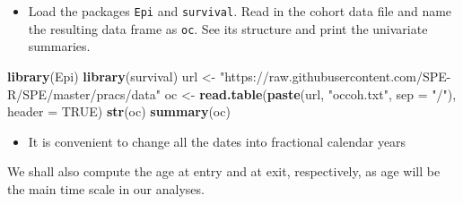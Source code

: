 \documentclass[
]{book}
\newenvironment{Shaded}{\begin{snugshade}}{\end{snugshade}}
\newcommand{\AttributeTok}[1]{\textcolor[rgb]{0.13,0.29,0.53}{#1}}
\newcommand{\ConstantTok}[1]{\textcolor[rgb]{0.56,0.35,0.01}{#1}}
\newcommand{\FunctionTok}[1]{\textcolor[rgb]{0.13,0.29,0.53}{\textbf{#1}}}
\newcommand{\NormalTok}[1]{#1}
\newcommand{\OtherTok}[1]{\textcolor[rgb]{0.56,0.35,0.01}{#1}}
\newcommand{\SpecialCharTok}[1]{\textcolor[rgb]{0.81,0.36,0.00}{\textbf{#1}}}
\newcommand{\StringTok}[1]{\textcolor[rgb]{0.31,0.60,0.02}{#1}}
\providecommand{\tightlist}{%
  \setlength{\itemsep}{0pt}\setlength{\parskip}{0pt}}
\begin{document}
\begin{itemize}
\tightlist
\item
  Load the packages \texttt{Epi} and \texttt{survival}.
  Read in the cohort data file and name
  the resulting data frame as \texttt{oc}.
  See its structure and print the univariate summaries.
\end{itemize}

\begin{Shaded}
\begin{Highlighting}[]
\FunctionTok{library}\NormalTok{(Epi)}
\FunctionTok{library}\NormalTok{(survival)}
\NormalTok{url }\OtherTok{\textless{}{-}} \StringTok{"https://raw.githubusercontent.com/SPE{-}R/SPE/master/pracs/data"}
\NormalTok{oc }\OtherTok{\textless{}{-}} \FunctionTok{read.table}\NormalTok{(}\FunctionTok{paste}\NormalTok{(url, }\StringTok{"occoh.txt"}\NormalTok{, }\AttributeTok{sep =} \StringTok{"/"}\NormalTok{), }\AttributeTok{header =} \ConstantTok{TRUE}\NormalTok{)}
\FunctionTok{str}\NormalTok{(oc)}
\FunctionTok{summary}\NormalTok{(oc)}
\end{Highlighting}
\end{Shaded}

\begin{itemize}
\tightlist
\item
  It is convenient to change all the dates into fractional calendar years
\end{itemize}

\begin{Shaded}
\end{Shaded}

We shall also compute the age at entry and at exit, respectively,
as age will be the main time scale in our analyses.

\begin{Shaded}
\end{Shaded}
\end{document}
